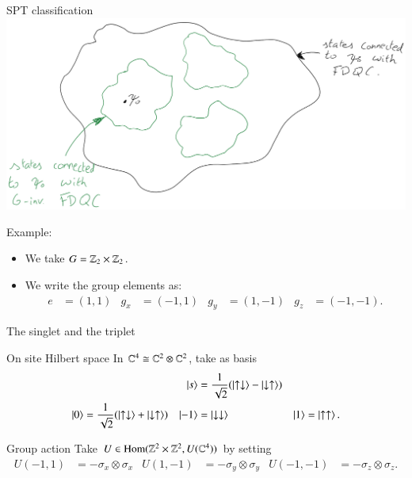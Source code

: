 \documentclass{beamer}
\begin{document}
\begin{frame}{SPT classification}
	\includegraphics[width=\textwidth]{Figures/ConnectedComponents.png}
\end{frame}

\begin{frame}{Example:}
	\begin{itemize}
		\item We take $G=\mathbb{Z}_2\times\mathbb{Z}_2$.
		\item We write the group elements as:
		\begin{align*}
			e&=(1,1)&g_x&=(-1,1)&g_y&=(1,-1)&g_z&=(-1,-1).
		\end{align*}
	\end{itemize}
	
\end{frame}

\begin{frame}{The singlet and the triplet}
	\begin{block}{On site Hilbert space}
		In $\mathbb{C}^4\cong \mathbb{C}^2\otimes \mathbb{C}^2$, take as basis
		\begin{align*}
			&&\ket{s}&=\frac{1}{\sqrt{2}}(\ket{\uparrow\downarrow}-\ket{\downarrow\uparrow})&&\\
			\ket{0}&=\frac{1}{\sqrt{2}}(\ket{\uparrow\downarrow}+\ket{\downarrow\uparrow})&\ket{-1}&=\ket{\downarrow\downarrow}&\ket{1}&=\ket{\uparrow\uparrow}.
		\end{align*}
	\end{block}
	\pause
	\begin{block}{Group action}
		Take $U\in \textrm{Hom}(\mathbb{Z}^2\times \mathbb{Z}^2,U(\mathbb{C}^4))$ by setting
		\begin{align*}
		U(-1,1)&=-\sigma_x\otimes \sigma_x&U(1,-1)&=-\sigma_y\otimes \sigma_y&U(-1,-1)&=-\sigma_z\otimes \sigma_z.
		\end{align*}
	\end{block}
\end{frame}
\end{document}
